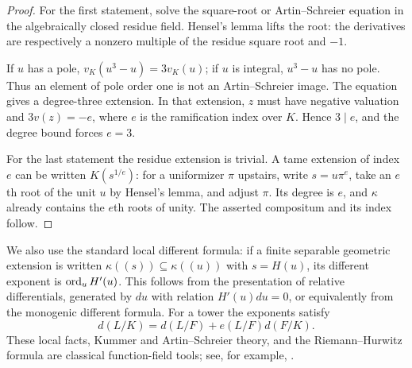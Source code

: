 \begin{proof}
For the first statement, solve the square-root or Artin--Schreier
equation in the algebraically closed residue field. Hensel's lemma
lifts the root: the derivatives are respectively a nonzero multiple
of the residue square root and $-1$.

If $u$ has a pole, $v_K(u^3-u)=3v_K(u)$; if $u$ is integral,
$u^3-u$ has no pole. Thus an element of pole order one is not an
Artin--Schreier image. The equation gives a degree-three extension.
In that extension, $z$ must have negative valuation and
$3v(z)=-e$, where $e$ is the ramification index over $K$. Hence
$3\mid e$, and the degree bound forces $e=3$.

For the last statement the residue extension is trivial. A tame
extension of index $e$ can be written $K(s^{1/e})$: for a
uniformizer $\pi$ upstairs, write $s=u\pi^e$, take an $e$th root
of the unit $u$ by Hensel's lemma, and adjust $\pi$.
Its degree is $e$, and $\kappa$ already contains the $e$th roots
of unity. The asserted compositum and its index follow.
\end{proof}

We also use the standard local different formula: if a finite
separable geometric extension is written
$\kappa((s))\subseteq\kappa((u))$ with $s=H(u)$, its different
exponent is $\operatorname{ord}_u H'(u)$. This follows from the presentation of
relative differentials, generated by $du$ with relation
$H'(u)du=0$, or equivalently from the monogenic different formula.
For a tower the exponents satisfy
\begin{equation}\label{eq:different-transitivity}
 d(L/K)=d(L/F)+e(L/F)d(F/K).
\end{equation}
These local facts, Kummer and Artin--Schreier theory, and the
Riemann--Hurwitz formula are classical function-field tools; see,
for example, \cite[Chapter~3]{stichtenoth2009function}.
